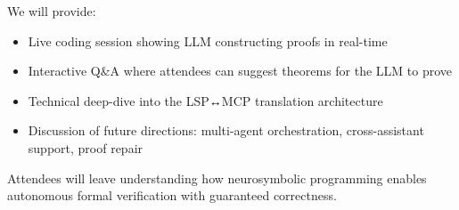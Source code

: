 \documentclass[sigconf,screen]{acmart}
\begin{document}
We will provide:
\begin{itemize}
\item Live coding session showing LLM constructing proofs in real-time
\item Interactive Q\&A where attendees can suggest theorems for the LLM to prove
\item Technical deep-dive into the LSP↔MCP translation architecture
\item Discussion of future directions: multi-agent orchestration, cross-assistant support, proof repair
\end{itemize}

Attendees will leave understanding how neurosymbolic programming enables autonomous formal verification with guaranteed correctness.
\end{document}
